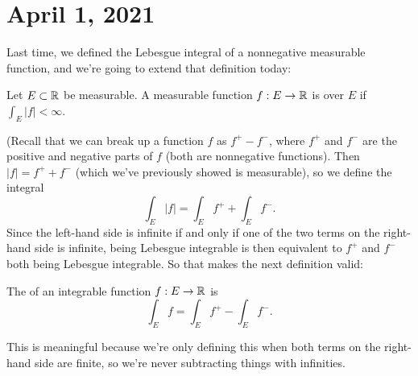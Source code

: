 \pagebreak\section{April 1, 2021}

Last time, we defined the Lebesgue integral of a nonnegative measurable function, and we're going to extend that definition today:

\begin{definition}
Let $E \subset \mathbb R$ be measurable. A measurable function $f: E \to \mathbb R$ is  over $E$ if $\int_E |f| < \infty$.
\end{definition}

(Recall that we can break up a function $f$ as $f^+ - f^-$, where $f^+$ and $f^-$ are the positive and negative parts of $f$ (both are nonnegative functions). Then $|f| = f^+ + f^-$ (which we've previously showed is measurable), so we define the integral
\[
    \int_E |f| = \int_E f^+ + \int_E f^-. 
\]
Since the left-hand side is infinite if and only if one of the two terms on the right-hand side is infinite, being Lebesgue integrable is then equivalent to $f^+$ and $f^-$ both being Lebesgue integrable. So that makes the next definition valid:

\begin{definition}
The  of an integrable function $f: E \to \mathbb R$ is 
\[
    \int_E f = \int_E f^+ - \int_E f^-.
\]
\end{definition}

This is meaningful because we're only defining this when both terms on the right-hand side are finite, so we're never subtracting things with infinities. 

